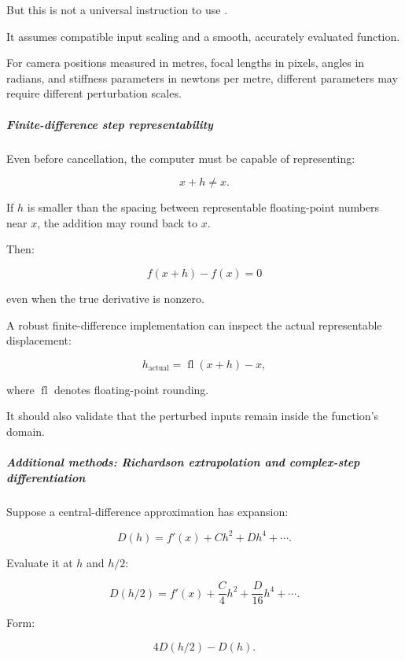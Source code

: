 But this is not a universal instruction to use .

It assumes compatible input scaling and a smooth, accurately evaluated function.

For camera positions measured in metres, focal lengths in pixels, angles in radians, and stiffness parameters in newtons per metre, different parameters may require different perturbation scales.

\subparagraph{Finite-difference step representability}\label{02-foundations-ii-ch025-finite-difference-step-representability}

\hypertarget{02-foundations-ii-ch025-finite-difference-step-representability}{}

Even before cancellation, the computer must be capable of representing:

\[
x+h\ne x.
\]

If \(h\) is smaller than the spacing between representable floating-point numbers near \(x\), the addition may round back to \(x\).

Then:

\[
f(x+h)-f(x)=0
\]

even when the true derivative is nonzero.

A robust finite-difference implementation can inspect the actual representable displacement:

\[
h_{\mathrm{actual}}=\operatorname{fl}(x+h)-x,
\]

where \(\operatorname{fl}\) denotes floating-point rounding.

It should also validate that the perturbed inputs remain inside the function's domain.

\subparagraph{Additional methods: Richardson extrapolation and complex-step differentiation}\label{02-foundations-ii-ch025-additional-methods-richardson-extrapolation-and-complex-step-differentiation}

\hypertarget{02-foundations-ii-ch025-additional-methods-richardson-extrapolation-and-complex-step-differentiation}{}

Suppose a central-difference approximation has expansion:

\[
D(h)=f'(x)+Ch^2+Dh^4+\cdots.
\]

Evaluate it at \(h\) and \(h/2\):

\[
D(h/2)=f'(x)+\frac C4h^2+\frac D{16}h^4+\cdots.
\]

Form:

\[
4D(h/2)-D(h).
\]

